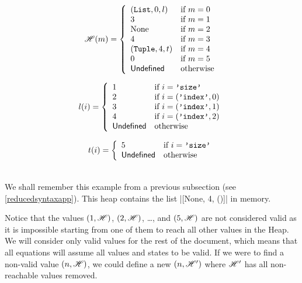 \begin{minipage}{.45\textwidth}
  \[\mathscr{H}(m) = \left\{
    \begin{array}{ll}
      (\texttt{List}, 0, l) & \text{if } m = 0 \\
      3 & \text{if } m = 1 \\
      \text{None} & \text{if } m = 2 \\
      4 & \text{if } m = 3 \\
      (\texttt{Tuple}, 4, t) & \text{if } m = 4 \\
      0 & \text{if } m = 5 \\
      \mathsf{Undefined} & \text{otherwise} \\
    \end{array}
  \right.\]
\end{minipage}
\begin{minipage}{.45\textwidth}
  \[l(i) = \left\{
    \begin{array}{ll}
      1 & \text{if } i = \texttt{'size'} \\
      2 & \text{if } i = (\texttt{'index'}, 0) \\
      3 & \text{if } i = (\texttt{'index'}, 1) \\
      4 & \text{if } i = (\texttt{'index'}, 2) \\
      \mathsf{Undefined}        & \text{otherwise} \\
    \end{array}
  \right.\]

  \[t(i) = \left\{
    \begin{array}{ll}
      5   & \text{if } i = \texttt{'size'} \\
      \mathsf{Undefined} & \text{otherwise} \\
    \end{array}
  \right.\]
\end{minipage}
\\[.4em]


We shall remember this example from a previous subsection (see \ref{reducedsyntaxapp}). This
heap contains the list \pycode|[None, 4, ()]| in memory.

Notice that the values \((1, \mathscr{H})\), \((2, \mathscr{H})\), \ldots{}, and \((5, \mathscr{H})\) are not
considered valid as it is impossible starting from one of them to reach all other values
in the Heap. We will consider only valid values for the rest of the document, which means
that all equations will assume all values and states to be valid. If we were to find a
non-valid value \((n, \mathscr{H})\), we could define a new \((n, \mathscr{H}')\) where \(\mathscr{H}'\) has
all non-reachable values removed.

